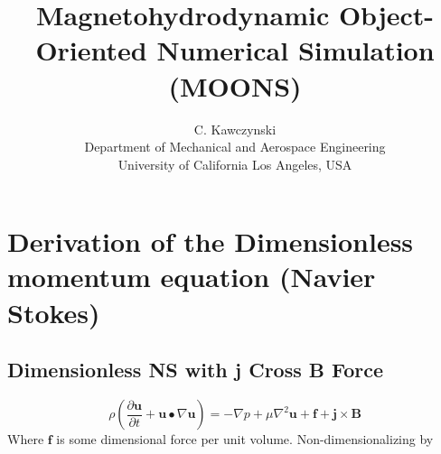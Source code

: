 \documentclass[11pt]{article}
\begin{document}
\doublespacing
\title{Magnetohydrodynamic Object-Oriented Numerical Simulation (MOONS)}
\author{C. Kawczynski \\
Department of Mechanical and Aerospace Engineering \\
University of California Los Angeles, USA\\
}
\maketitle

\section{Derivation of the Dimensionless momentum equation (Navier Stokes)}
\subsection{Dimensionless NS with j Cross B Force}
\begin{equation}
\rho \left( \frac{\partial \pmb{u}}{\partial t} + \pmb{u} \bullet \nabla \pmb{u} \right) = 
-\nabla p + \mu \nabla^2 \pmb{u} + \pmb{f} + \pmb{j} \times \pmb{B}
\end{equation}
Where $\pmb{f}$ is some dimensional force per unit volume. Non-dimensionalizing by
\end{document}
